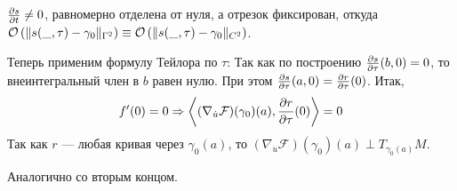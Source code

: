 \documentclass[a4paper]{article}
\begin{document}
    $\frac{\partial s}{\partial t} \neq 0$, равномерно отделена от нуля, а отрезок фиксирован, откуда $\mathcal{O}\left(\|s(\_, \tau) - \gamma_0\|_{\Gamma^2}\right) \equiv \mathcal{O}\left(\|s(\_, \tau) - \gamma_0\|_{C^2}\right)$.

    Теперь применим формулу Тейлора по $\tau$:
    Так как по построению $\frac{\partial s}{\partial \tau}(b, 0) = 0$, то внеинтегральный член в $b$ равен нулю.
    При этом $\frac{\partial s}{\partial \tau}(a, 0) = \frac{\partial r}{\partial \tau}(0)$.
    Итак,
    \[f'(0) = 0 \Rightarrow \left\langle(\nabla_{\dot{u}}\mathcal{F})(\gamma_0)(a), \frac{\partial r}{\partial \tau}(0)\right\rangle = 0\]
    Так как $r$ --- любая кривая через $\gamma_0(a)$, то $(\nabla_{\dot{u}}\mathcal{F})(\gamma_0)(a) \perp T_{\gamma_0(a)}M$.

    Аналогично со вторым концом.
\end{document}
